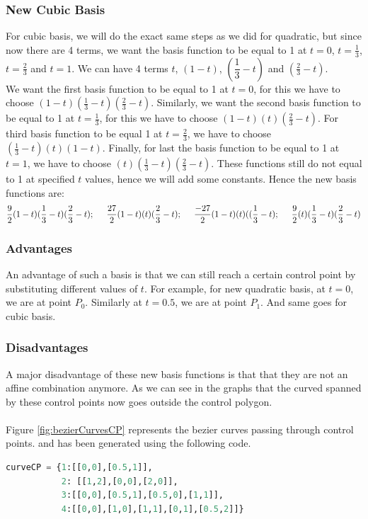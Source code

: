 \documentclass[a4paper, 11pt]{article}
\begin{document}
\begin{enumerate}
\begin{enumerate}[label=\alph*.]
    \subsubsection*{New Cubic Basis}
    For cubic basis, we will do the exact same steps as we did for quadratic, but since now there are 4 terms, we want the basis function to be equal to 1 at \(t=0\), \(t=\frac{1}{3}\), \(t = \frac{2}{3}\) and \(t=1\). We can have 4 terms \(t\), \((1-t)\), \((\dfrac{1}{3}-t)\) and \((\frac{2}{3}-t)\). \\
    We want the first basis function to be equal to 1 at \(t=0\), for this we have to choose \((1-t)(\frac{1}{3}-t)(\frac{2}{3}-t)\). Similarly, we want the second basis function to be equal to 1 at \(t=\frac{1}{3}\), for this we have to choose \((1-t)(t)(\frac{2}{3}-t)\). For third basis function to be equal 1 at \(t=\frac{2}{3}\), we have to choose \((\frac{1}{3}-t)(t)(1-t)\). Finally, for last the basis function to be equal to 1 at \(t = 1\), we have to choose \((t)(\frac{1}{3}-t)(\frac{2}{3}-t)\). These functions still do not equal to 1 at specified \(t\) values, hence we will add some constants. Hence the new basis functions are:
    \begin{equation}
        \label{cubicNewBasis}
        \frac{9}{2}(1-t)(\frac{1}{3}-t)(\frac{2}{3}-t) ; \hspace{0.5cm} \frac{27}{2}(1-t)(t)(\frac{2}{3}-t) ;
        \hspace{0.5cm}
        \frac{-27}{2}(1-t)(t)((\frac{1}{3}-t);
        \hspace{0.5cm}
        \frac{9}{2}(t)(\frac{1}{3}-t)(\frac{2}{3}-t)
    \end{equation}
    \subsubsection*{Advantages}
    An advantage of such a basis is that we can still reach a certain control point by substituting different values of \(t\). For example, for new quadratic basis, at \(t = 0\), we are at point \(P_0\). Similarly at \(t=0.5\), we are at point \(P_1\). And same goes for cubic basis. 
    \subsubsection*{Disadvantages}
    A major disadvantage of these new basis functions is that that they are not an affine combination anymore. As we can see in the graphs that the curved spanned by these control points now goes outside the control polygon.  \\ \\
    Figure \ref{fig:bezierCurvesCP} represents the bezier curves passing through control points. and has been generated using the following code. 
    \begin{lstlisting}[language=Python]
curveCP = {1:[[0,0],[0.5,1]], 
           2: [[1,2],[0,0],[2,0]],
           3:[[0,0],[0.5,1],[0.5,0],[1,1]],
           4:[[0,0],[1,0],[1,1],[0,1],[0.5,2]]}  
           

\end{lstlisting}
\end{enumerate}
\end{enumerate}
\end{document}
